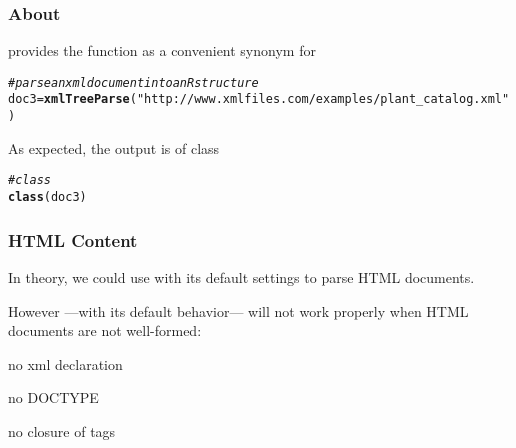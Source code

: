 \documentclass[12pt]{beamer}\usepackage[]{graphicx}\usepackage[]{color}
\makeatletter
\newcommand{\hlstr}[1]{\textcolor[rgb]{0.192,0.494,0.8}{#1}}%
\newcommand{\hlcom}[1]{\textcolor[rgb]{0.678,0.584,0.686}{\textit{#1}}}%
\newcommand{\hlstd}[1]{\textcolor[rgb]{0.345,0.345,0.345}{#1}}%
\newcommand{\hlkwb}[1]{\textcolor[rgb]{0.69,0.353,0.396}{#1}}%
\newcommand{\hlkwd}[1]{\textcolor[rgb]{0.737,0.353,0.396}{\textbf{#1}}}%
\newenvironment{kframe}{%
 \def\at@end@of@kframe{}%
 \ifinner\ifhmode%
  \def\at@end@of@kframe{\end{minipage}}%
  \begin{minipage}{\columnwidth}%
 \fi\fi%
 \def\FrameCommand##1{\hskip\@totalleftmargin \hskip-\fboxsep
 \colorbox{shadecolor}{##1}\hskip-\fboxsep
     \hskip-\linewidth \hskip-\@totalleftmargin \hskip\columnwidth}%
 \MakeFramed {\advance\hsize-\width
   \@totalleftmargin\z@ \linewidth\hsize
   \@setminipage}}%
 {\par\unskip\endMakeFramed%
 \at@end@of@kframe}
\newenvironment{knitrout}{}{} %
\makeatother
\begin{document}
\begin{frame}[fragile]
\frametitle{About }

 provides the function {\hilit {}} as a convenient synonym for 

\begin{knitrout}\scriptsize
{}\color{fgcolor}\begin{kframe}
\begin{alltt}
\hlcom{# parse an xml document into an R structure}
\hlstd{doc3} \hlkwb{=} \hlkwd{xmlTreeParse}\hlstd{(}\hlstr{"http://www.xmlfiles.com/examples/plant_catalog.xml"}\hlstd{)}
\end{alltt}
\end{kframe}
\end{knitrout}

As expected, the output is of class {\hilit {}}

\begin{knitrout}\footnotesize
{}\color{fgcolor}\begin{kframe}


{\ttfamily\noindent\bfseries\color{errorcolor}{\#\# Error: XML content does not seem to be XML: '../plant\_catalog.xml'}}\begin{alltt}
\hlcom{# class }
\hlkwd{class}\hlstd{(doc3)}
\end{alltt}


{\ttfamily\noindent\bfseries\color{errorcolor}{\#\# Error in eval(expr, envir, enclos): object 'doc3' not found}}\end{kframe}
\end{knitrout}
\eb

\end{frame}


\begin{frame}[fragile]
\frametitle{HTML Content}

In theory, we could use {\hilit {}} with its default settings to parse HTML documents. 

\bigskip
However  ---with its default behavior--- will not work properly when HTML documents are not well-formed:
\bi
 \item no xml declaration
 \item no DOCTYPE
 \item no closure of tags
\ei
\eb

\end{frame}
\end{document}
